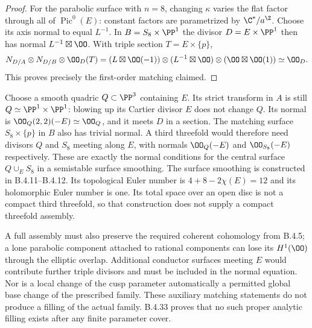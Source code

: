 \begin{proof}
For the parabolic surface with $n=8$, changing $\kappa$ varies the
flat factor through all of $\operatorname{Pic}^0(E)$:
constant factors are parametrized by $\C^*/a^\Z$.
Choose its axis normal to equal $L^{-1}$.
In $B=S_8\times\PP^1$ the divisor $D=E\times\PP^1$ then has normal
$L^{-1}\boxtimes\OO$. With triple section $T=E\times\{p\}$,
\[
 N_{D/A}\otimes N_{D/B}\otimes\OO_D(T)
   =(L\boxtimes\OO(-1))\otimes
     (L^{-1}\boxtimes\OO)\otimes(\OO\boxtimes\OO(1))
   \simeq\OO_D.
\]
This proves precisely the first-order matching claimed.
\end{proof}

\begin{remark}
Choose a smooth quadric $Q\subset\PP^3$ containing $E$.
Its strict transform in $A$ is still $Q\simeq\PP^1\times\PP^1$:
blowing up its Cartier divisor $E$ does not change $Q$.
Its normal is
$\OO_Q(2,2)(-E)\simeq\OO_Q$, and it meets $D$ in a section.
The matching surface $S_8\times\{p\}$ in $B$ also has trivial
normal. A third threefold would therefore need divisors $Q$ and
$S_8$ meeting along $E$, with normals
$\OO_Q(-E)$ and $\OO_{S_8}(-E)$ respectively.
These are exactly the normal conditions for the central surface
$Q\cup_E S_8$ in a semistable surface smoothing.
The surface smoothing is constructed in B.4.11--B.4.12.
Its topological Euler number is $4+8-2\chi(E)=12$ and its
holomorphic Euler number is one. Its total space over an open
disc is not a compact third threefold, so that construction
does not supply a compact threefold assembly.

A full assembly must also preserve the required coherent cohomology
from B.4.5; a lone parabolic component attached to rational components
can lose its $H^1(\OO)$ through the elliptic overlap.
Additional conductor surfaces meeting $E$ would contribute further
triple divisors and must be included in the normal equation.
Nor is a local change of the cusp parameter automatically a permitted
global base change of the prescribed family.
These auxiliary matching statements do not produce a filling
of the actual family. B.4.33 proves that no such proper analytic
filling exists after any finite parameter cover.
\end{remark}

